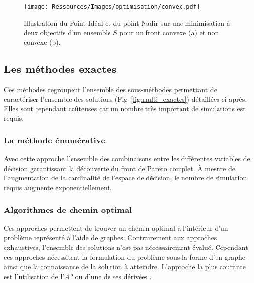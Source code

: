 \begin{figure}
    \begin{center}
        \texttt{[image: Ressources/Images/optimisation/convex.pdf]}
    \end{center}
    \caption{Illustration du Point Idéal et du point Nadir sur une minimisation
             à deux objectifs d’un ensemble $S$ pour un front convexe (a) et non
             convexe (b).
             \label{fig:convex_nadir}}
\end{figure}



\subsection{Les méthodes exactes} %
\label{sub:les_methodes_exactes}
Ces méthodes regroupent l’ensemble des sous-méthodes permettant de caractériser l’ensemble
des solutions (Fig~\ref{fig:multi_exactes}) détaillées ci-après. Elles sont cependant
coûteuses car un nombre très important de simulations est requis.


\subsubsection{La méthode énumérative} %
\label{ssub:la_methode_enumerative}
Avec cette approche l’ensemble des combinaisons entre les différentes variables de
décision garantissant la découverte du front de Pareto complet. À mesure de
l’augmentation de la cardinalité de l’espace de décision, le nombre de simulation requis
augmente exponentiellement.


\subsubsection{Algorithmes de chemin optimal} %
\label{ssub:algorithmes_de_chemin_optimal}
Ces approches permettent de trouver un chemin optimal à l’intérieur d’un problème
représenté à l’aide de graphes. Contrairement aux approches exhaustives, l’ensemble des
solutions n’est pas nécessairement évalué. Cependant ces approches nécessitent la
formulation du problème sous la forme d’un graphe ainsi que la connaissance de la solution
à atteindre. L’approche la plus courante est l’utilisation de l’\textit{A*} ou d’une de
ses dérivées \parencite{Hart1968100}.


